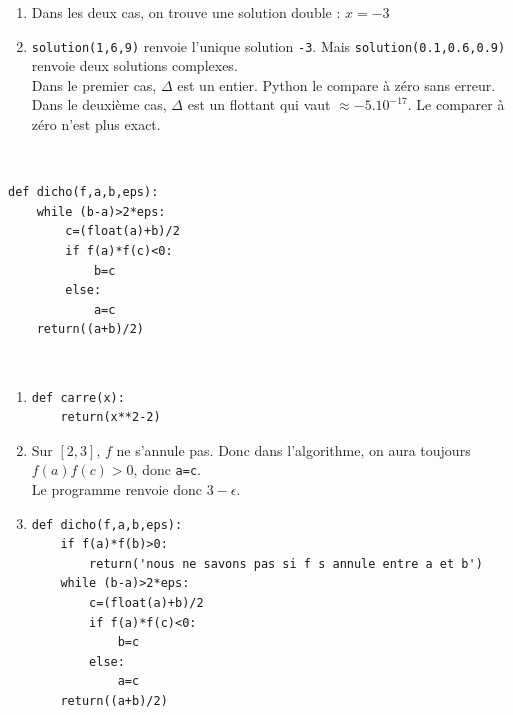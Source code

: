 \begin{solution}
\begin{enumerate}
\item Dans les deux cas, on trouve une solution double : $x=-3$
\item \verb?solution(1,6,9)? renvoie l'unique solution \verb?-3?. Mais \verb?solution(0.1,0.6,0.9)? renvoie deux solutions complexes.\\
Dans le premier cas, $\Delta$ est un entier. Python le compare \` a z\' ero sans erreur. Dans le deuxi\` eme cas, $\Delta$ est un flottant qui vaut $\approx -5.10^{-17}$. Le comparer \` a z\' ero n'est plus exact.
\end{enumerate}
\end{solution}



\begin{solution} ~\\
\vspace*{-0.7cm}
\begin{verbatim}
def dicho(f,a,b,eps):               
    while (b-a)>2*eps:
        c=(float(a)+b)/2
        if f(a)*f(c)<0:
            b=c
        else:
            a=c    
    return((a+b)/2)    
\end{verbatim}
\end{solution}

\newpage

\begin{solution}
 ~\\
\vspace*{-0.7cm}
\begin{enumerate}
\item \begin{verbatim}
def carre(x):
	return(x**2-2)    
\end{verbatim}
\item Sur $[2,3]$, $f$ ne s'annule pas. Donc dans l'algorithme, on aura toujours $f(a)f(c)>0$, donc \verb?a=c?.\\
Le programme renvoie donc $3-\epsilon$.
\item  \begin{verbatim}
def dicho(f,a,b,eps):               
    if f(a)*f(b)>0:
        return('nous ne savons pas si f s annule entre a et b')
    while (b-a)>2*eps:
        c=(float(a)+b)/2
        if f(a)*f(c)<0:
            b=c
        else:
            a=c    
    return((a+b)/2)
\end{verbatim}
\end{enumerate}
\end{solution}



